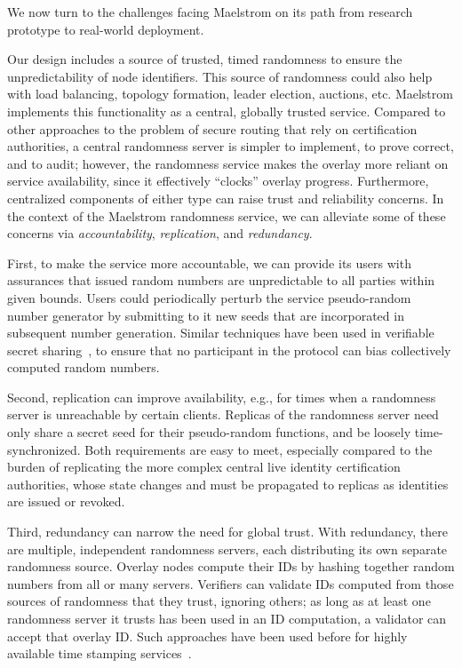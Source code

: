 \documentclass[10pt,twocolumn]{article}
\begin{document}
We now turn to the challenges
facing Maelstrom on its path from research prototype to real-world deployment.

Our design includes a source of trusted, timed randomness to
ensure the unpredictability of node identifiers. This source of randomness could also help with load
balancing, topology formation, leader election, auctions, etc.
Maelstrom implements this functionality as a 
central, globally trusted service. Compared to other approaches to the
problem of secure routing that rely on certification authorities, a
central randomness server is simpler to implement, to prove correct, and
to audit; however, the randomness service makes the overlay more reliant
on service availability, since it
effectively ``clocks'' overlay progress.  Furthermore, centralized
components of either type can raise trust and reliability concerns.
In the context of the Maelstrom randomness service, we
can alleviate some of these concerns via \emph{accountability},
\emph{replication}, and \emph{redundancy}.

First, to make the service more accountable, we can provide its users with
assurances that issued random numbers are unpredictable to all parties
within given bounds. Users could periodically perturb the service pseudo-random
number generator by submitting to it new seeds that are incorporated in
subsequent number generation.  Similar techniques have been used in
verifiable secret sharing~\cite{Pedersen1991}, to ensure that no
participant in the protocol can bias collectively computed random
numbers.

Second, replication can improve availability, e.g., for times when a
randomness server is unreachable by certain clients.  Replicas of the
randomness server need only share a secret seed for their pseudo-random
functions, and be loosely time-synchronized.  Both requirements are
easy to meet, especially compared to the burden of replicating
the more complex central live identity certification
authorities, whose state changes and must be propagated to replicas as
identities are issued or revoked.

Third, redundancy can narrow
the need for global trust.  With
redundancy, there are multiple, independent randomness servers, each distributing its
own separate randomness source.  Overlay nodes compute their IDs by
hashing together random numbers from all or many servers.  Verifiers can
validate IDs computed from those sources of randomness that they trust,
ignoring others; as long as at least one randomness server it trusts has
been used in an ID computation, a validator can accept that overlay
ID. Such approaches have been used before for highly available time
stamping services~\cite{Ansper2001}.
\end{document}
